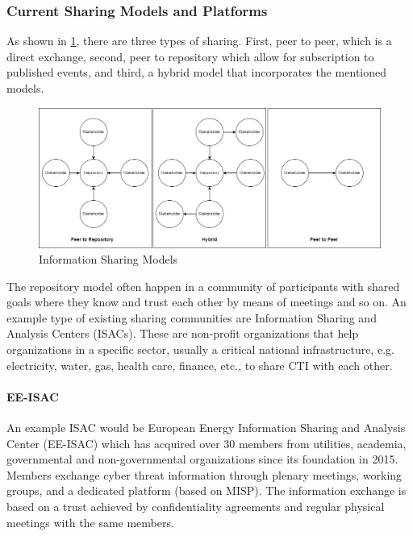 \subsubsection{Current Sharing Models and Platforms}

As shown in \ref{fig:sharing-models}, there are three types of sharing. First, peer to peer, which is a direct exchange, second, peer to repository which allow for subscription to published events, and third, a hybrid model that incorporates the mentioned models.

\begin{figure}[ht]
    \centering
    \includegraphics[width=\textwidth]{diagrams/background/sharing_models.png}
    \caption{Information Sharing Models \cite{wagner_cyber_2019}}
    \label{fig:sharing-models}
\end{figure}

The repository model often happen in a community of participants with shared goals where they know and trust each other by means of meetings and so on. An example type of existing sharing communities are Information Sharing and Analysis Centers (ISACs). These are non-profit organizations that help organizations in a specific sector, usually a critical national infrastructure, e.g. electricity, water, gas, health care, finance, etc., to share CTI with each other. 

\paragraph{EE-ISAC}
An example ISAC would be European Energy Information Sharing and Analysis Center (EE-ISAC) which has acquired over 30 members from utilities, academia, governmental and non-governmental organizations since its foundation in 2015. Members exchange cyber threat information through plenary meetings, working groups, and a dedicated platform (based on MISP). 
The information exchange is based on a trust achieved by confidentiality agreements and regular physical meetings with the same members. 
\cite{wallis_ee-isacpractical_2022}

